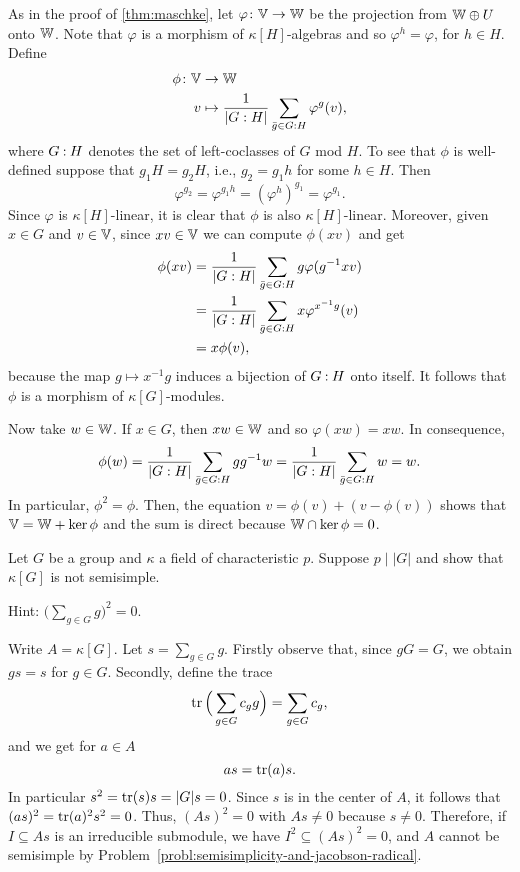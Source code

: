 \begin{solution}
    As in the proof of \eqref{thm:maschke}, let $\varphi\colon\mathbb V\to\mathbb W$ be the projection from $\mathbb W\oplus U$ onto $\mathbb W$. Note that $\varphi$ is a morphism of $\kappa[H]$-algebras and so $\varphi^h=\varphi$, for $h\in H$. Define
    \begin{align*}
        \phi\colon\mathbb V&\to\mathbb W\\
        v&\mapsto\frac1{|G:H|}\sum_{\bar g\in G\mathbin:H}
            \varphi^g(v),
    \end{align*}
    where $G\mathbin:H$ denotes the set of left-coclasses of $G$ mod $H$. To see that $\phi$ is well-defined suppose that $g_1H=g_2H$, i.e., $g_2=g_1h$ for some $h\in H$. Then
    $$
        \varphi^{g_2}=\varphi^{g_1h}
            = (\varphi^h)^{g_1}
            = \varphi^{g_1}.
    $$
    Since $\varphi$ is $\kappa[H]$-linear, it is clear that $\phi$ is also $\kappa[H]$-linear. Moreover, given $x\in G$ and $v\in\mathbb V$, since $xv\in\mathbb V$ we can compute $\phi(xv)$ and get
    \begin{align*}
        \phi(xv) &= \frac1{|G:H|}\sum_{\bar g\in G\mathbin:H}
                g\varphi(g^{-1}xv)\\
            &= \frac1{|G:H|}\sum_{\bar g\in G\mathbin:H}
                x\varphi^{x^{-1}g}(v)\\
            &= x\phi(v),
    \end{align*}
    because the map $g\mapsto x^{-1}g$ induces a bijection of $G\mathbin:H$ onto itself. It follows that $\phi$ is a morphism of $\kappa[G]$-modules.

    Now take $w\in\mathbb W$. If $x\in G$, then $xw\in\mathbb W$ and so $\varphi(xw)=xw$. In consequence,
    $$
        \phi(w)=\frac1{|G:H|}\sum_{\bar g\in G\mathbin:H}gg^{-1}w
            =\frac1{|G:H|}\sum_{\bar g\in G\mathbin:H}w=w.
    $$
    In particular, $\phi^2=\phi$. Then, the equation $v=\phi(v)+(v-\phi(v))$ shows that $\mathbb V=\mathbb W+\ker\phi$ and the sum is direct because $\mathbb W\cap\ker\phi=0$.
\end{solution}

\begin{probl}
    Let\/ $G$ be a group and\/ $\kappa$ a field of characteristic\/ $p$. Suppose\/ $p \mid |G|$ and show that\/ $\kappa[G]$ is not semisimple.
    
    \textrm{\rm Hint: $\big(\sum_{g \in G} g\big)^2 = 0$.}
\end{probl}

\begin{solution}
    Write $A=\kappa[G]$. Let $s=\sum_{g\in G}g$. Firstly observe that, since $gG=G$, we obtain $gs=s$ for $g\in G$. Secondly, define the trace
    $$
        \operatorname{tr}\Big(\sum_{g\in G}c_gg\Big)=\sum_{g\in G}c_g,
    $$
    and we get for $a\in A$
    $$
        as=\operatorname{tr}(a)s.
    $$
    In particular $s^2=\operatorname{tr}(s)s=|G|s=0$. Since $s$ is in the center of $A$, it follows that $(as)^2=\operatorname{tr}(a)^2s^2=0$. Thus, $(As)^2=0$ with $As\ne0$ because $s\ne0$. Therefore, if $I\subseteq As$ is an irreducible submodule, we have $I^2\subseteq(As)^2=0$, and $A$ cannot be semisimple by Problem~\ref{probl:semisimplicity-and-jacobson-radical}.
    
\end{solution}

